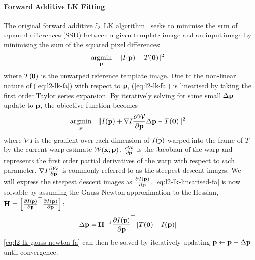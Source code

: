 \paragraph{Forward Additive LK Fitting}\label{subsubsec:lk-fa}
The original forward additive $\ell_2$ LK
algorithm~\cite{baker2004lucas,lucas1981iterative} seeks to minimise the sum of
squared differences (SSD) between a given template image and an input image by
minimising the sum of the squared pixel differences:
\begin{equation}\label{eq:l2-lk-fa}
    \argmin_{\p} \quad \norm{I(\p) - T(\zero)}^2
\end{equation}
where $T(\boldsymbol{\mathbf{0}})$ is the unwarped reference template image. Due to the non-linear
nature of (\ref{eq:l2-lk-fa}) with respect to $\boldsymbol{\mathbf{p}}$, (\ref{eq:l2-lk-fa}) is
linearised by taking the first order Taylor series expansion. By iteratively
solving for some small $\Delta \boldsymbol{\mathbf{p}}$ update to $\boldsymbol{\mathbf{p}}$, the objective function
becomes
\begin{equation}\label{eq:l2-lk-linearised-fa}
    \argmin_{\p} \quad \norm{I(\p) + \nabla I \frac{\partial \mathcal{W}}{\partial \p} \Delta \p - T(\zero)}^2
\end{equation}
where $\nabla I$ is the gradient over each dimension of $I(\boldsymbol{\mathbf{p}})$ warped into the
frame of $T$ by the current warp estimate $\mathcal{W}(\boldsymbol{\mathbf{x}};\boldsymbol{\mathbf{p}})$.
$\frac{\partial \mathcal{W}}{\partial \boldsymbol{\mathbf{p}}}$ is the Jacobian of the warp and
represents the first order partial derivatives of the warp with respect to each
parameter. $\nabla I \frac{\partial \mathcal{W}}{\partial \boldsymbol{\mathbf{p}}}$ is commonly
referred to as the steepest descent images. We will express the steepest descent
images as $\frac{\partial I(\boldsymbol{\mathbf{p}})}{\partial \boldsymbol{\mathbf{p}}}$. 
\cref{eq:l2-lk-linearised-fa} is now solvable by assuming the 
Gauss-Newton approximation to the Hessian,
$\boldsymbol{\mathbf{H}} = \left[ {\frac{\partial I(\boldsymbol{\mathbf{p}})}{\partial \boldsymbol{\mathbf{p}}}}^{\top} \frac{\partial I(\boldsymbol{\mathbf{p}})}{\partial \boldsymbol{\mathbf{p}}} \right]$:
\begin{equation}\label{eq:l2-lk-gauss-newton-fa}
    \Delta \boldsymbol{\mathbf{p}} = \boldsymbol{\mathbf{H}}^{-1} \frac{\partial I(\boldsymbol{\mathbf{p}})}{\partial \boldsymbol{\mathbf{p}}}^{\top} \left[ T(\boldsymbol{\mathbf{0}}) - I(\boldsymbol{\mathbf{p}}) \right]
\end{equation}
\cref{eq:l2-lk-gauss-newton-fa} can then be solved by iteratively
updating $\boldsymbol{\mathbf{p}} \leftarrow \boldsymbol{\mathbf{p}} + \Delta \boldsymbol{\mathbf{p}}$ until convergence.
